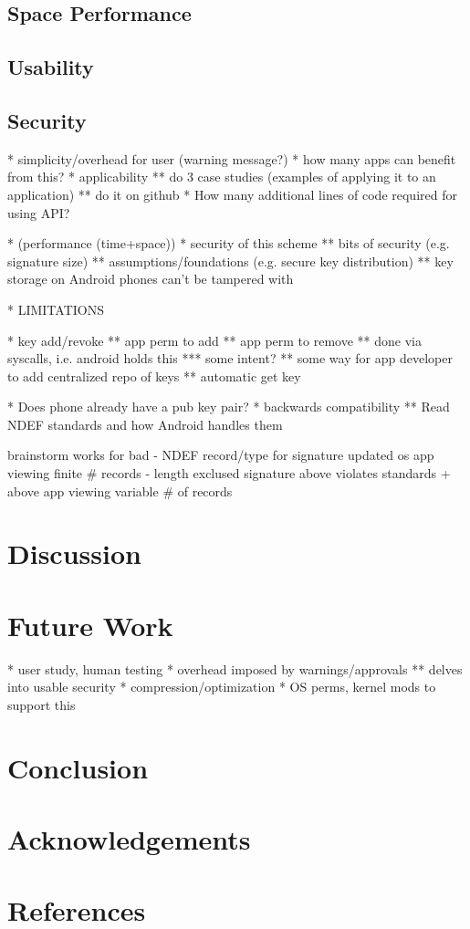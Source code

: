 \documentclass[12pt]{article}
\begin{document}
\subsection{Space Performance}
\subsection{Usability}
\subsection{Security}
* simplicity/overhead for user (warning message?)
* how many apps can benefit from this?
* applicability
** do 3 case studies (examples of applying it to an application)
** do it on github
* How many additional lines of code required for using API?

* (performance (time+space))
* security of this scheme
** bits of security (e.g. signature size)
** assumptions/foundations (e.g. secure key distribution)
** key storage on Android phones can't be tampered with

* LIMITATIONS

* key add/revoke
** app perm to add
** app perm to remove
** done via syscalls, i.e. android holds this
*** some intent?
** some way for app developer to add centralized repo of keys
** automatic get key

* Does phone already have a pub key pair?
* backwards compatibility
** Read NDEF standards and how Android handles them

brainstorm                         works for                           bad
- NDEF record/type for signature   updated os
                                   app viewing finite \# records
- length exclused signature        above                               violates standards
  + above                          app viewing variable \# of records   

\section{Discussion}

\section{Future Work}
* user study, human testing
* overhead imposed by warnings/approvals
** delves into usable security
* compression/optimization
* OS perms, kernel mods to support this

\section{Conclusion}

\section{Acknowledgements}

\section{References}



\end{document}
